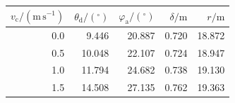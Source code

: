 \begin{tabular}{rrrrr}
\toprule
$v_{\mathrm c}/(\mathrm{m\,s^{-1}})$ & $\theta_{\mathrm d}/(^\circ)$ & $\varphi_{\mathrm a}/(^\circ)$ & $\delta/\mathrm m$ & $r/\mathrm m$ \\
\midrule
0.0 & 9.446 & 20.887 & 0.720 & 18.872 \\
0.5 & 10.048 & 22.107 & 0.724 & 18.947 \\
1.0 & 11.794 & 24.682 & 0.738 & 19.130 \\
1.5 & 14.508 & 27.135 & 0.762 & 19.363 \\
\bottomrule
\end{tabular}
